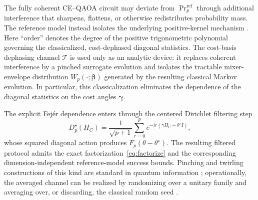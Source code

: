 \documentclass[a4paper,unpublished,onecolumn,11pt]{quantumarticle}
\theoremstyle{definition}
\theoremstyle{remark}
\begin{document}

The fully coherent CE--QAOA circuit may deviate from
$\Pr^{\mathrm{ref}}_p$ through additional interference that sharpens,
flattens, or otherwise redistributes probability mass. The reference
model instead isolates the underlying positive-kernel mechanism
\cite{Watrous2018,SteinShakarchi2003Fourier}. Here ``order'' denotes
the degree of the positive trigonometric polynomial governing the
classicalized, cost-dephased diagonal statistics. The cost-basis
dephasing channel $\mathcal T$ is used only as an analytic device:
it replaces coherent interference by a pinched surrogate evolution and
isolates the tractable mixer-envelope distribution
$W_p(\cdot;\boldsymbol\beta)$ generated by the resulting classical
Markov evolution. In particular, this classicalization eliminates the
dependence of the diagonal statistics on the cost angles
$\boldsymbol\gamma$.

The explicit Fej\'er dependence enters through the centered
Dirichlet filtering step
\begin{equation}
D_p^\star(H_C)
=
\frac{1}{\sqrt{p+1}}
\sum_{r=0}^{p}
e^{-ir(\gamma H_C-\theta^\star I)},
\end{equation}
whose squared diagonal action produces
$F_p(\theta-\theta^\star)$. The resulting filtered protocol admits the
exact factorization~\eqref{eq:factorize} and the corresponding
dimension-independent reference-model success bounds. Pinching and
twirling constructions of this kind are standard in quantum information
\cite{Watrous2018}; operationally, the averaged channel can be realized
by randomizing over a unitary family and averaging over, or discarding,
the classical random seed \cite{BennettEtAl1996Purification}.






\end{document}
